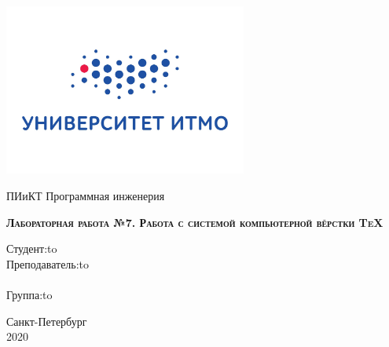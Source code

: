 \thispagestyle{empty}
\begin{center}
\includegraphics[width=8cm]{itmo.jpg}
\end{center}

\vspace{8em}

\begin{center}
\Large ПИиКТ Программная инженерия \\ 
\end{center}

\vspace{2em}

\begin{center}
\large{
\textsc{\textbf{Лабораторная работа №7. \linebreak Работа с системой компьютерной вёрстки \TeX{}}}
}
\end{center}

\vspace{12em}



\newbox{\lbox}
\newlength{\maxl}
\setlength{\maxl}{\wd\lbox}
\hfill\parbox{11cm}{
\hspace*{5cm}\hspace*{-5cm}Студент:\hfill\hbox to\\
\hspace*{5cm}\hspace*{-5cm}Преподаватель:\hfill\hbox to\\
\\
\hspace*{5cm}\hspace*{-5cm}Группа:\hfill\hbox to\\
}


\vspace{\fill}

\begin{center}
Санкт-Петербург \\2020
\end{center}
\newpage
